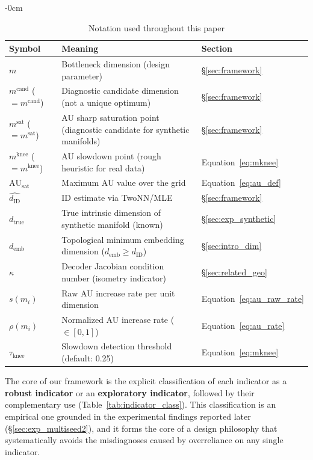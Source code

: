 \documentclass[make,article,submit,pdftex,moreauthors]{Definitions/mdpi}
\newcommand{\dID}{d_{\mathrm{ID}}}
\newcommand{\dzopt}{m^{\mathrm{cand}}}
\newcommand{\dtrue}{d_{\mathrm{true}}}
\newcommand{\kap}{\kappa}
\newcommand{\AUsat}{\mathrm{AU}_{\mathrm{sat}}}
\newcommand{\dzsat}{m^{\mathrm{sat}}}
\newcommand{\mknee}{m^{\mathrm{knee}}}
\newcommand{\demb}{d_{\mathrm{emb}}}
\begin{document}
\begin{table}[H]
\begin{adjustwidth}{-\extralength}{0cm}
\centering
\caption{Notation used throughout this paper}
\label{tab:notation}
\small
\begin{tabular}{lll}
\toprule
Symbol & Meaning & Section \\
\midrule
$m$ & Bottleneck dimension (design parameter) & §\ref{sec:framework} \\
$\dzopt$ ($= m^{\mathrm{cand}}$) & Diagnostic candidate dimension (not a unique optimum) & §\ref{sec:framework} \\
$\dzsat$ ($= m^{\mathrm{sat}}$) & AU sharp saturation point (diagnostic candidate for synthetic manifolds) & §\ref{sec:framework} \\
$\mknee$ ($= m^{\mathrm{knee}}$) & AU slowdown point (rough heuristic for real data) & Equation~\eqref{eq:mknee} \\
$\AUsat$ & Maximum AU value over the grid & Equation~\eqref{eq:au_def} \\
$\hat{\dID}$ & ID estimate via TwoNN/MLE & §\ref{sec:framework} \\
$\dtrue$ & True intrinsic dimension of synthetic manifold (known) & §\ref{sec:exp_synthetic} \\
$\demb$ & Topological minimum embedding dimension ($\demb \geq \dID$) & §\ref{sec:intro_dim} \\
$\kap$ & Decoder Jacobian condition number (isometry indicator) & §\ref{sec:related_geo} \\
$s(m_i)$ & Raw AU increase rate per unit dimension & Equation~\eqref{eq:au_raw_rate} \\
$\rho(m_i)$ & Normalized AU increase rate ($\in[0,1]$) & Equation~\eqref{eq:au_rate} \\
$\tau_{\mathrm{knee}}$ & Slowdown detection threshold (default: 0.25) & Equation~\eqref{eq:mknee} \\
\bottomrule
\end{tabular}
\end{adjustwidth}
\end{table}

The core of our framework is the explicit classification of each indicator as a
\textbf{robust indicator} or an \textbf{exploratory indicator}, followed by their
complementary use (Table~\ref{tab:indicator_class}).
This classification is an empirical one grounded in the experimental findings
reported later (§\ref{sec:exp_multiseed2}), and it forms the core of a design
philosophy that systematically avoids the misdiagnoses caused by overreliance on
any single indicator.
\end{document}
